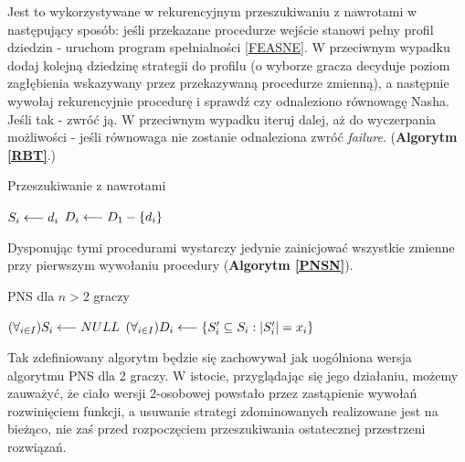 \documentclass[polish]{standalone}
\begin{document}
Jest to wykorzystywane w rekurencyjnym przeszukiwaniu z nawrotami w następujący sposób: jeśli przekazane procedurze
wejście stanowi pełny profil dziedzin - uruchom program spełnialności \ref{FEASNE}. W przeciwnym wypadku dodaj kolejną
dziedzinę strategii do profilu (o wyborze gracza decyduje poziom zagłębienia wskazywany przez przekazywaną procedurze
zmienną), a następnie wywołaj rekurencyjnie procedurę i sprawdź czy odnaleziono równowagę Nasha. Jeśli tak - zwróć ją.
W przeciwnym wypadku iteruj dalej, aż do wyczerpania możliwości - jeśli równowaga nie zostanie odnaleziona zwróć
\textit{failure}. (\textbf{Algorytm \ref{RBT}}.)

\begin{algorithm}
\caption{Przeszukiwanie z nawrotami}
\label{RBT}
\begin{algorithmic}
 \ELSE
 \ENDIF
\ELSE
  \STATE $S_i \longleftarrow d_i$
  \STATE $D_i \longleftarrow D_1 - \{ d_i \}$
  \ENDIF
 \ENDFOR 
\ENDIF
\end{algorithmic}
\end{algorithm}

Dysponując tymi procedurami wystarczy jedynie zainicjować wszystkie zmienne przy pierwszym wywołaniu procedury
(\textbf{Algorytm \ref{PNSN}}).

\begin{algorithm}
\caption{PNS dla $n > 2$ graczy}
\label{PNSN}
\begin{algorithmic}
 \STATE $(\forall_{i \in I}) S_i \longleftarrow NULL$
 \STATE $(\forall_{i \in I}) D_i \longleftarrow \{ S_i' \subseteq S_i : |S_i'| = x_i \}$
 \ENDIF
\ENDFOR
\end{algorithmic}
\end{algorithm}

Tak zdefiniowany algorytm będzie się zachowywał jak uogólniona wersja algorytmu PNS dla 2 graczy. W istocie,
przyglądając się jego działaniu, możemy zauważyć, że ciało wersji 2-osobowej powstało przez zastąpienie wywołań
rozwinięciem funkcji, a usuwanie strategi zdominowanych realizowane jest na bieżąco, nie zaś przed rozpoczęciem
przeszukiwania ostatecznej przestrzeni rozwiązań.
\end{document}
